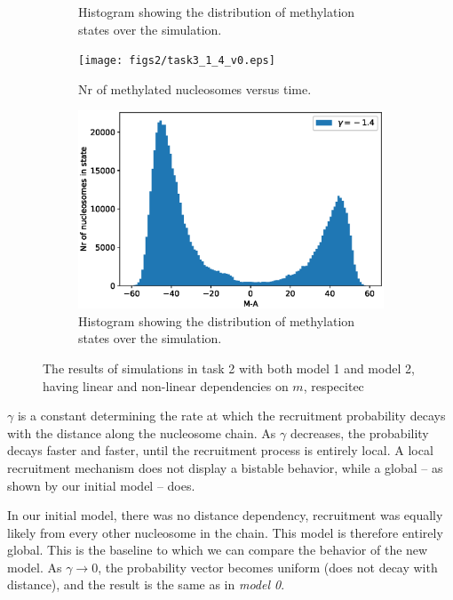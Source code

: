 \documentclass{article}
\begin{document}
\begin{figure}[H]
\begin{subfigure}[b]{.49\textwidth}
		\caption{Histogram showing the distribution of methylation states over the simulation.}
		\label{fig:task2_hist}
	\end{subfigure}
	\begin{subfigure}[b]{.49\textwidth}
		\centering
		\texttt{[image: figs2/task3\_1\_4\_v0.eps]}
		\caption{Nr of methylated nucleosomes versus time.\\ }
		\label{fig:task2_m_vs_t}
	\end{subfigure}
	\begin{subfigure}[b]{.49\textwidth}
		\centering
		\includegraphics[width= \linewidth]{figs2/task3_hist_1_4_v0.eps}
		\caption{Histogram showing the distribution of methylation states over the simulation.}
		\label{fig:task2_hist}
	\end{subfigure}
		\caption{The results of simulations in task 2 with both model 1 and model 2, having linear and non-linear dependencies on $m$, respecitec}
		\label{fig:task2}
\end{figure}

$\gamma$ is a constant determining the rate at which the recruitment probability decays with the distance along the nucleosome chain. As $\gamma$ decreases, the probability decays faster and faster, until the recruitment process is entirely local. A local recruitment mechanism does not display a bistable behavior, while a global -- as shown by our initial model -- does. 

In our initial model, there was no distance dependency, recruitment was equally likely from every other nucleosome in the chain. This model is therefore entirely global. 
This is the baseline to which we can compare the behavior of the new model. 
As $\gamma\to 0$, the probability vector becomes uniform (does not decay with distance), and the result is the same as in \textit{model 0}.
\end{document}
